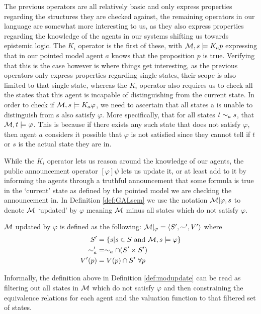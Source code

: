 The previous operators are all relatively basic and only express properties regarding the structures they are checked against, the remaining operators in our language are somewhat more interesting to us, as they also express properties regarding the knowledge of the agents in our systems shifting us towards epistemic logic. The $K_i$ operator is the first of these, with $\mathcal{M} ,s \models K_ap$ expressing that in our pointed model agent $a$ knows that the proposition $p$ is true. Verifying that this is the case however is where things get interesting, as the previous operators only express properties regarding single states, their scope is also limited to that single state, whereas the $K_i$ operator also requires us to check all the states that this agent is incapable of distinguishing from the current state. In order to check if $\mathcal{M},s \models K_a\varphi$, we need to ascertain that all states a is unable to distinguish from s also satisfy $\varphi$. More specifically, that for all states $t\sim_as$, that $\mathcal{M},t \models\varphi$. This is because if there exists any such state that does not satisfy $\varphi$, then agent $a$ considers it possible that $\varphi$ is not satisfied since they cannot tell if $t$ or $s$ is the actual state they are in.

While the $K_i$ operator lets us reason around the knowledge of our agents, the public announcement operator $[\varphi]\psi$ lets us update it, or at least add to it by informing the agents through a truthful announcement that some formula is true in the `current' state as defined by the pointed model we are checking the announcement in.
In Definition \ref{def:GALsem} we use the notation $\mathcal{M}|\varphi,s$ to denote $\mathcal{M}$ `updated' by $\varphi$ meaning $\mathcal{M}$ minus all states which do not satisfy $\varphi$.

\begin{definition}
	\label{def:modupdate}
	$\mathcal{M}$ updated by $\varphi$ is defined as the following: $\mathcal{M}|_\varphi = \langle S',\sim',V'\rangle$ where 
	\begin{align*}
			S' &= \{s| s\in S\textrm{ and }\mathcal{M},s \models\varphi\} \\
			\sim_a' &= \sim_a \cap (S' \times S') \\
			V'(p) &= V(p) \cap S'~ \forall p
	\end{align*}
\end{definition}

Informally, the definition above in Definition \ref{def:modupdate} can be read as filtering out all states in $\mathcal{M}$ which do not satisfy $\varphi$ and then constraining the equivalence relations for each agent and the valuation function to that filtered set of states.

